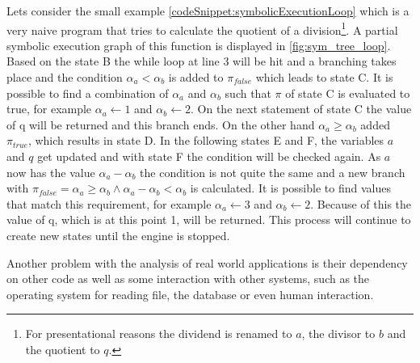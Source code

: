 Lets consider the small example \ref{codeSnippet:symbolicExecutionLoop} which is a very naive program that tries to calculate the quotient of a division\footnote{For presentational reasons the dividend is renamed to $a$, the divisor to $b$ and the quotient to $q$.}. A partial symbolic execution graph of this function is displayed in \ref{fig:sym_tree_loop}. Based on the state B the while loop at line 3 will be hit and a branching takes place and the condition $\alpha_a < \alpha_b$ is added to $\pi_{false}$ which leads to state C. It is possible to find a combination of $\alpha_a$ and $\alpha_b$ such that $\pi$ of state C is evaluated to true, for example $\alpha_a \gets 1$ and $\alpha_b \gets 2$. On the next statement of state C the value of q will be returned and this branch ends. On the other hand $\alpha_a \geq \alpha_b$ added $\pi_{true}$, which results in state D. In the following states E and F, the variables $a$ and $q$ get updated and with state F the condition will be checked again. As $a$ now has the value $\alpha_a - \alpha_b$ the condition is not quite the same and a new branch with $\pi_{false} = \alpha_a \geq \alpha_b \land \alpha_a - \alpha_b < \alpha_b$ is calculated. It is possible to find values that match this requirement, for example $\alpha_a \gets 3$ and $\alpha_b \gets 2$. Because of this the value of q, which is at this point 1, will be returned. This process will continue to create new states until the engine is stopped.

Another problem with the analysis of real world applications is their dependency on other code as well as some interaction with other systems, such as the operating system for reading file, the database or even human interaction.

